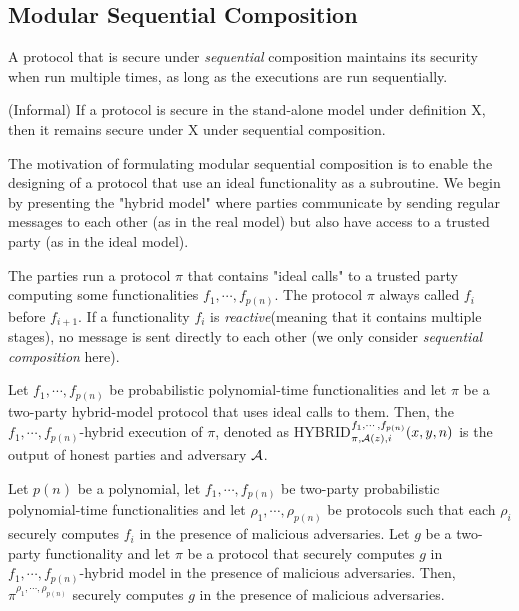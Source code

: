 \subsection{Modular Sequential Composition}
A protocol that is secure under {\it sequential} composition maintains its security when run multiple times, as long as the executions are run sequentially.
\begin{theorem}(Informal) If a protocol is secure in the stand-alone model under definition X, then it remains secure under X under sequential composition.
\end{theorem}
\begin{description}[leftmargin=0em]
\item[Modular sequential composition.] The motivation of formulating modular sequential composition is to enable the designing of a protocol that use an ideal functionality as a subroutine. We begin by presenting the "hybrid model" where parties communicate by sending regular messages to each other (as in the real model) but also have access to a trusted party (as in the ideal model).
\item[The hybrid model.] The parties run a protocol $\pi$ that contains "ideal calls" to a trusted party computing some functionalities $f_1,\cdots,f_{p(n)}$. The protocol $\pi$ always called $f_i$ before $f_{i+1}$. If a functionality $f_i$ is {\it reactive}(meaning that it contains multiple stages), no message is sent directly to each other (we only consider {\it sequential composition} here).
\item[Sequential composition-malicious adversaries] Let $f_1,\cdots,f_{p(n)}$ be probabilistic polynomial-time functionalities and let $\pi$ be a two-party hybrid-model protocol that uses ideal calls to them. Then, the $f_1,\cdots,f_{p(n)}$-{\sf hybrid execution of }$\pi$, denoted as {\sf HYBRID}$^{f_1,\cdots,f_{p(n)}}_{\pi,\mathcal{A}(z),i}(x,y,n)$ is the output of honest parties and adversary $\mathcal{A}$.
\end{description}
\begin{theorem} Let $p(n)$ be a polynomial, let $f_1,\cdots,f_{p(n)}$ be two-party probabilistic polynomial-time functionalities and let $\rho_1,\cdots,\rho_{p(n)}$ be protocols such that each $\rho_i$ securely computes $f_i$ in the presence of malicious adversaries. Let $g$ be a two-party functionality and let $\pi$ be a protocol that securely computes $g$ in $f_1,\cdots,f_{p(n)}$-{\sf hybrid model} in the presence of malicious adversaries. Then, $\pi^{\rho_1,\cdots,\rho_{p(n)}}$ securely computes $g$ in the presence of malicious adversaries.
\end{theorem}

